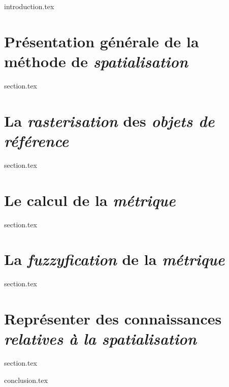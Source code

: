 \chaptertoc{}

\label{chap:07-int}
{introduction.tex}

\section{Présentation générale de la méthode de \emph{spatialisation}}
\label{chap:07-sec1}
{section.tex}

\section{La \emph{rasterisation} des \emph{objets de référence}}
\label{chap:07-sec2}
{section.tex}

\section{Le calcul de la \emph{métrique}}
\label{chap:07-sec3}
{section.tex}

\section{La \emph{fuzzyfication} de la \emph{métrique}}
\label{chap:07-sec4}
{section.tex}

\section{Représenter des connaissances \emph{relatives à la spatialisation}}
\label{chap:07-sec5}
{section.tex}

\label{chap:07-cnc}
{conclusion.tex}

